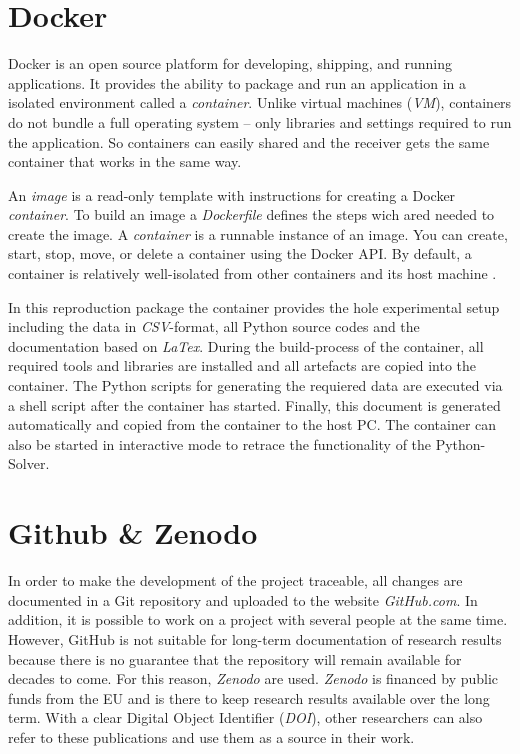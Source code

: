 \documentclass{article}
\begin{document}
\begin{multicols}{2}
\section{Docker} \label{sec:Docker}
Docker is an open source platform for developing, shipping, and running applications. It provides the ability to package and run an application in a isolated environment called a \textit{container}. Unlike virtual machines (\textit{VM}), containers do not bundle a full operating system -- only libraries and settings required to run the application. So containers can easily shared and the receiver gets the same container that works in the same way.

An \textit{image} is a read-only template with instructions for creating a Docker \textit{container}. To build an image a \textit{Dockerfile} defines the steps wich ared needed to create the image. A \textit{container} is a runnable instance of an image. You can create, start, stop, move, or delete a container using the Docker API. By default, a container is relatively well-isolated from other containers and its host machine \cite{Docker}. 

In this reproduction package the container provides the hole experimental setup including the data in \textit{CSV}-format, all Python source codes and the documentation based on \textit{LaTex}. During the build-process of the container, all required tools and libraries are installed and all artefacts are copied into the container. The Python scripts for generating the requiered data are executed via a shell script after the container has started. Finally, this document is generated automatically and copied from the container to the host PC. The container can also be started in interactive mode to retrace the functionality of the Python-Solver.

\section{Github \& Zenodo}
In order to make the development of the project traceable, all changes are documented in a Git repository and uploaded to the website \textit{GitHub.com}. In addition, it is possible to work on a project with several people at the same time. However, GitHub is not suitable for long-term documentation of research results because there is no guarantee that the repository will remain available for decades to come. For this reason, \textit{Zenodo} are used.
\textit{Zenodo} \cite{zenodo} is financed by public funds from the EU and is there to keep research results available over the long term. With a clear Digital Object Identifier (\textit{DOI}), other researchers can also refer to these publications and use them as a source in their work.



\end{multicols}
\end{document}
